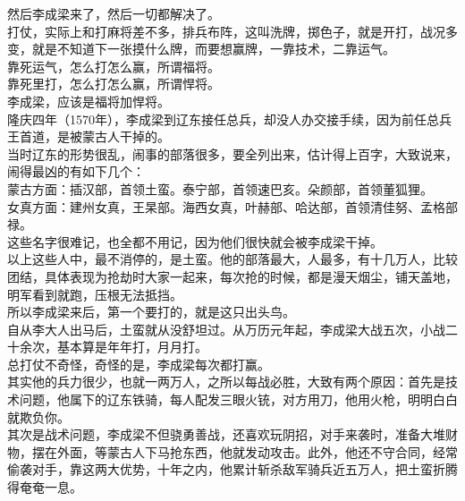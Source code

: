 \begin{multicols}{\theparacolNo}
然后李成梁来了，然后一切都解决了。\\

打仗，实际上和打麻将差不多，排兵布阵，这叫洗牌，掷色子，就是开打，战况多变，就是不知道下一张摸什么牌，而要想赢牌，一靠技术，二靠运气。\\

靠死运气，怎么打怎么赢，所谓福将。\\

靠死里打，怎么打怎么赢，所谓悍将。\\

李成梁，应该是福将加悍将。\\

隆庆四年（1570年），李成梁到辽东接任总兵，却没人办交接手续，因为前任总兵王首道，是被蒙古人干掉的。\\

当时辽东的形势很乱，闹事的部落很多，要全列出来，估计得上百字，大致说来，闹得最凶的有如下几个：\\

蒙古方面：插汉部，首领土蛮。泰宁部，首领速巴亥。朵颜部，首领董狐狸。\\

女真方面：建州女真，王杲部。海西女真，叶赫部、哈达部，首领清佳努、孟格部禄。\\

这些名字很难记，也全都不用记，因为他们很快就会被李成梁干掉。\\

以上这些人中，最不消停的，是土蛮。他的部落最大，人最多，有十几万人，比较团结，具体表现为抢劫时大家一起来，每次抢的时候，都是漫天烟尘，铺天盖地，明军看到就跑，压根无法抵挡。\\

所以李成梁来后，第一个要打的，就是这只出头鸟。\\

自从李大人出马后，土蛮就从没舒坦过。从万历元年起，李成梁大战五次，小战二十余次，基本算是年年打，月月打。\\

总打仗不奇怪，奇怪的是，李成梁每次都打赢。\\

其实他的兵力很少，也就一两万人，之所以每战必胜，大致有两个原因：首先是技术问题，他属下的辽东铁骑，每人配发三眼火铳，对方用刀，他用火枪，明明白白就欺负你。\\

其次是战术问题，李成梁不但骁勇善战，还喜欢玩阴招，对手来袭时，准备大堆财物，摆在外面，等蒙古人下马抢东西，他就发动攻击。此外，他还不守合同，经常偷袭对手，靠这两大优势，十年之内，他累计斩杀敌军骑兵近五万人，把土蛮折腾得奄奄一息。\\


\end{multicols}
